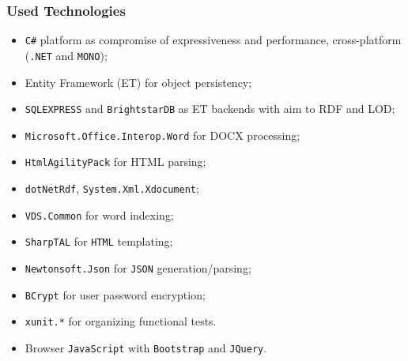 \documentclass[10pt,dvipsnames]{beamer}
\begin{document}
\begin{frame}
  \frametitle{Used Technologies}

  \begin{itemize}
  \item \texttt{C\#} platform as compromise of expressiveness and performance, cross-platform (\texttt{.NET} and \texttt{MONO});
  \item Entity Framework (ET) for object persistency;
  \item \texttt{SQLEXPRESS} and \texttt{BrightstarDB} as ET backends with aim to RDF and LOD;
  \item \texttt{Microsoft.Office.Interop.Word} for DOCX processing;
  \item \texttt{HtmlAgilityPack} for HTML parsing;
  \item \texttt{dotNetRdf}, \texttt{System.Xml.Xdocument};
  \item \texttt{VDS.Common} for word indexing;
  \item \texttt{SharpTAL} for \texttt{HTML} templating;
  \item \texttt{Newtonsoft.Json} for \texttt{JSON} generation/parsing;
  \item \texttt{BCrypt} for user password encryption;
  \item \texttt{xunit.*} for organizing functional tests.
  \item Browser \texttt{JavaScript} with \texttt{Bootstrap} and \texttt{JQuery}.
  \end{itemize}

\end{frame}
\end{document}
